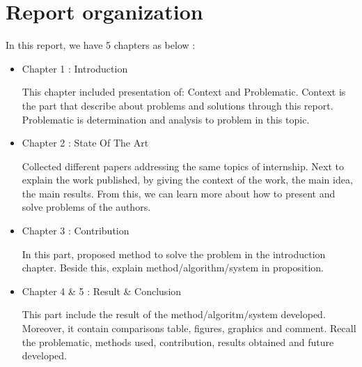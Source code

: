 










\section{Report organization}
In this report, we have 5 chapters as below :
\begin{itemize}
\item Chapter 1 : Introduction

This chapter included presentation of: Context and Problematic. Context is the part that describe about problems and solutions through this report. Problematic is determination and analysis to problem in this topic. 
\item  Chapter 2 : State Of The Art

Collected different papers addressing the same topics of internship. Next to explain the work published, by giving the context of the work, the main idea, the main results. From this, we can learn more about how to present and solve problems of the authors. 

\item  Chapter 3 : Contribution

In this part, proposed method to solve the problem in the introduction chapter. Beside this, explain method/algorithm/system in proposition.

\item  Chapter 4 \& 5 : Result \& Conclusion

This part include the result of the method/algoritm/system developed. Moreover, it contain comparisons table,  figures, graphics and comment. Recall the problematic, methods used,  contribution, results obtained and future developed.

\end{itemize}
